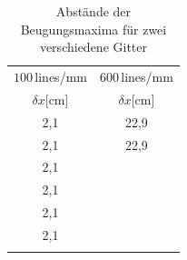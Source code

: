 \begin{table}
\centering
\caption{Abstände der Beugungsmaxima für zwei verschiedene Gitter}
\begin{tabular}{c c}
\toprule
$100\,$lines/mm&$600\,$lines/mm\\
$\delta x$[cm]&$\delta x$[cm]\\
\midrule
2,1	&	22,9	\\
2,1	&	22,9	\\
2,1	&		\\
2,1	&		\\
2,1	&		\\
2,1	&		\\
\bottomrule
\label{tab:WellenAbstand}
\end{tabular}
\end{table}






























































